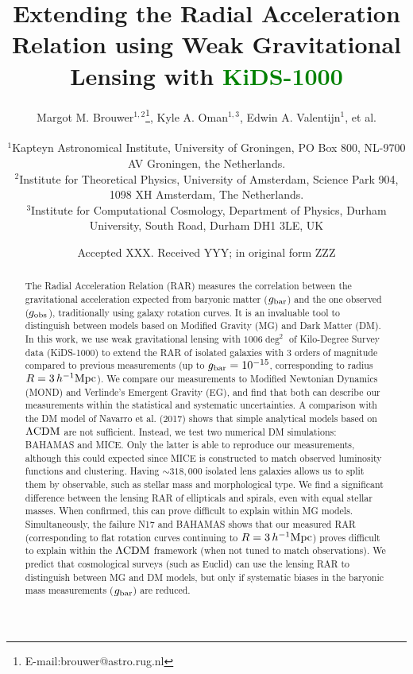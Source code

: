 \documentclass[usenatbib]{mnras}
\title[Extending the RAR using weak lensing with KiDS-1000]{Extending the Radial Acceleration Relation using Weak Gravitational Lensing with \textcolor{Green}{KiDS-1000}}
\author[M. M. Brouwer et al.]{Margot M. Brouwer$^{1,2}$\thanks{E-mail:brouwer@astro.rug.nl}, Kyle A. Oman$^{1,3}$, Edwin A. Valentijn$^{1}$, et al.
	\\
	\\
	$^{1}$Kapteyn Astronomical Institute, University of Groningen, PO Box 800, NL-9700 AV Groningen, the Netherlands.\\
	$^{2}$Institute for Theoretical Physics, University of Amsterdam, Science Park 904, 1098 XH Amsterdam, The Netherlands. \\
    $^{3}$Institute for Computational Cosmology, Department of Physics, Durham University, South Road, Durham DH1 3LE, UK \\
}
\date{Accepted XXX. Received YYY; in original form ZZZ}
\newcommand{\hMpc}{\, h^{-1}{\rm{Mpc}} }
\newcommand{\lcdm}{{\rm \Lambda CDM}}
\newcommand{\un}[1]{_{\rm #1}}
\begin{document}
\label{firstpage}
\pagerange{\pageref{firstpage}--\pageref{lastpage}}
\maketitle

\begin{abstract}
The Radial Acceleration Relation (RAR) measures the correlation between the gravitational acceleration expected from baryonic matter ($g\un{bar}$) and the one observed ($g\un{obs}$), traditionally using galaxy rotation curves. It is an invaluable tool to distinguish between models based on Modified Gravity (MG) and Dark Matter (DM). In this work, we use weak gravitational lensing with $1006 \deg^2$ of Kilo-Degree Survey data (KiDS-1000) to extend the RAR of isolated galaxies with $3$ orders of magnitude compared to previous measurements (up to $g\un{bar}=10^{-15}$, corresponding to radius $R=3\hMpc$). We compare our measurements to Modified Newtonian Dynamics (MOND) and Verlinde's Emergent Gravity (EG), and find that both can describe our measurements within the statistical and systematic uncertainties. A comparison with the DM model of Navarro et al. (2017) shows that simple analytical models based on $\lcdm$ are not sufficient. Instead, we test two numerical DM simulations: BAHAMAS and MICE. Only the latter is able to reproduce our measurements, although this could expected since MICE is constructed to match observed luminosity functions and clustering. Having $\sim318,000$ isolated lens galaxies allows us to split them by observable, such as stellar mass and morphological type. We find a significant difference between the lensing RAR of ellipticals and spirals, even with equal stellar masses. When confirmed, this can prove difficult to explain within MG models. Simultaneously, the failure N17 and BAHAMAS shows that our measured RAR (corresponding to flat rotation curves continuing to $R=3\hMpc$) proves difficult to explain within the $\lcdm$ framework (when not tuned to match observations). We predict that cosmological surveys (such as Euclid) can use the lensing RAR to distinguish between MG and DM models, but only if systematic biases in the baryonic mass measurements ($g\un{bar}$) are reduced.
\end{abstract}
\end{document}
